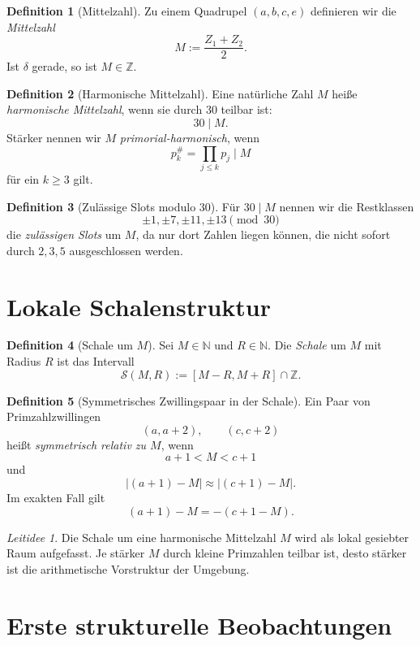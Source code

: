 \documentclass[11pt,a4paper]{article}
\theoremstyle{definition}
\newtheorem{definition}{Definition}[section]
\theoremstyle{plain}
\theoremstyle{remark}
\newtheorem*{idea}{Leitidee}
\newcommand{\N}{\mathbb{N}}
\newcommand{\Z}{\mathbb{Z}}
\newcommand{\abs}[1]{\left|#1\right|}
\begin{document}
	\begin{definition}[Mittelzahl]
		Zu einem Quadrupel $(a,b,c,e)$ definieren wir die \emph{Mittelzahl}
		\[
		M:=\frac{Z_1+Z_2}{2}.
		\]
		Ist $\delta$ gerade, so ist $M\in\Z$.
	\end{definition}
	
	\begin{definition}[Harmonische Mittelzahl]
		Eine natürliche Zahl $M$ heiße \emph{harmonische Mittelzahl}, wenn sie durch $30$ teilbar ist:
		\[
		30\mid M.
		\]
		Stärker nennen wir $M$ \emph{primorial-harmonisch}, wenn
		\[
		p_k^\#=\prod_{j\le k}p_j \mid M
		\]
		für ein $k\ge 3$ gilt.
	\end{definition}
	
	\begin{definition}[Zulässige Slots modulo $30$]
		Für $30\mid M$ nennen wir die Restklassen
		\[
		\pm1,\pm7,\pm11,\pm13 \pmod{30}
		\]
		die \emph{zulässigen Slots} um $M$, da nur dort Zahlen liegen können, die nicht sofort durch $2,3,5$ ausgeschlossen werden.
	\end{definition}
	
	\section{Lokale Schalenstruktur}
	
	\begin{definition}[Schale um $M$]
		Sei $M\in\N$ und $R\in\N$. 
		Die \emph{Schale} um $M$ mit Radius $R$ ist das Intervall
		\[
		\mathcal S(M,R):=[M-R,M+R]\cap \Z.
		\]
	\end{definition}
	
	\begin{definition}[Symmetrisches Zwillingspaar in der Schale]
		Ein Paar von Primzahlzwillingen
		\[
		(a,a+2),\qquad (c,c+2)
		\]
		heißt \emph{symmetrisch relativ zu $M$}, wenn
		\[
		a+1<M<c+1
		\]
		und
		\[
		\abs{(a+1)-M}\approx \abs{(c+1)-M}.
		\]
		Im exakten Fall gilt
		\[
		(a+1)-M = -(c+1-M).
		\]
	\end{definition}
	
	\begin{idea}
		Die Schale um eine harmonische Mittelzahl $M$ wird als lokal gesiebter Raum aufgefasst. 
		Je stärker $M$ durch kleine Primzahlen teilbar ist, desto stärker ist die arithmetische Vorstruktur der Umgebung.
	\end{idea}
	
	\section{Erste strukturelle Beobachtungen}
	
\end{document}
